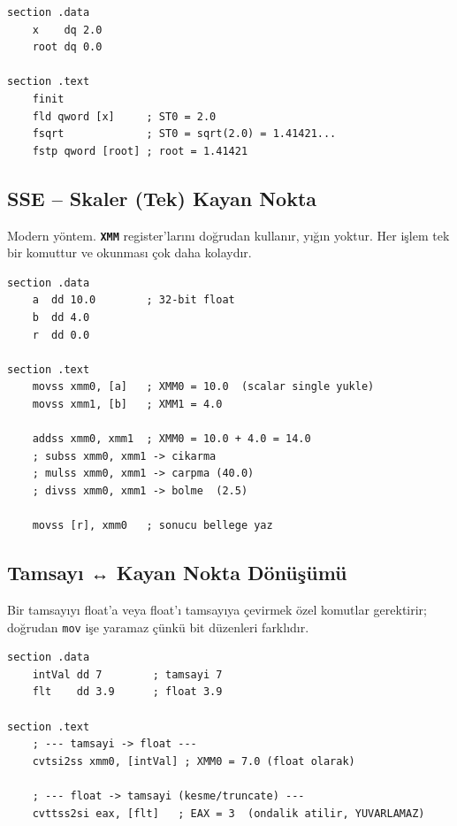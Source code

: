 \documentclass[11pt,a4paper]{article}
\newcommand{\reg}[1]{\texttt{\color{anaMavi}\textbf{#1}}}
\newcommand{\kod}[1]{\texttt{\color{koyuGri}#1}}
\begin{document}
\begin{ornekkutu}
\begin{lstlisting}
section .data
    x    dq 2.0
    root dq 0.0

section .text
    finit
    fld qword [x]     ; ST0 = 2.0
    fsqrt             ; ST0 = sqrt(2.0) = 1.41421...
    fstp qword [root] ; root = 1.41421
\end{lstlisting}
\end{ornekkutu}

\subsection{SSE -- Skaler (Tek) Kayan Nokta}

Modern yöntem. \reg{XMM} register'larını doğrudan kullanır, yığın yoktur.
Her işlem tek bir komuttur ve okunması çok daha kolaydır.

\begin{ornekkutu}
\begin{lstlisting}
section .data
    a  dd 10.0        ; 32-bit float
    b  dd 4.0
    r  dd 0.0

section .text
    movss xmm0, [a]   ; XMM0 = 10.0  (scalar single yukle)
    movss xmm1, [b]   ; XMM1 = 4.0

    addss xmm0, xmm1  ; XMM0 = 10.0 + 4.0 = 14.0
    ; subss xmm0, xmm1 -> cikarma
    ; mulss xmm0, xmm1 -> carpma (40.0)
    ; divss xmm0, xmm1 -> bolme  (2.5)

    movss [r], xmm0   ; sonucu bellege yaz
\end{lstlisting}
\end{ornekkutu}

\subsection{Tamsayı ↔ Kayan Nokta Dönüşümü}

Bir tamsayıyı float'a veya float'ı tamsayıya çevirmek özel komutlar gerektirir;
doğrudan \kod{mov} işe yaramaz çünkü bit düzenleri farklıdır.

\begin{ornekkutu}
\begin{lstlisting}
section .data
    intVal dd 7        ; tamsayi 7
    flt    dd 3.9      ; float 3.9

section .text
    ; --- tamsayi -> float ---
    cvtsi2ss xmm0, [intVal] ; XMM0 = 7.0 (float olarak)

    ; --- float -> tamsayi (kesme/truncate) ---
    cvttss2si eax, [flt]   ; EAX = 3  (ondalik atilir, YUVARLAMAZ)
\end{lstlisting}
\end{ornekkutu}
\end{document}

